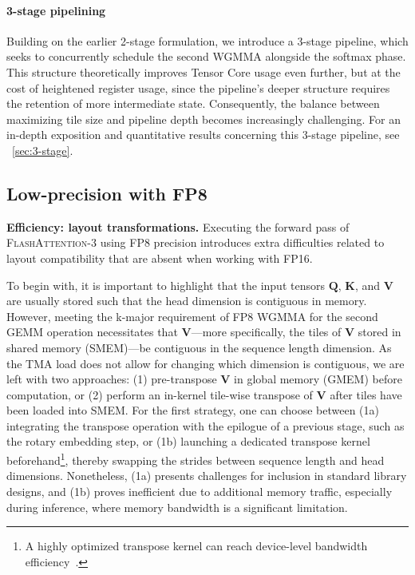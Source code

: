 \begin{enumerate}
\paragraph{3-stage pipelining} Building on the earlier 2-stage formulation, we introduce a 3-stage pipeline, which seeks to concurrently schedule the second WGMMA alongside the softmax phase. This structure theoretically improves Tensor Core usage even further, but at the cost of heightened register usage, since the pipeline's deeper structure requires the retention of more intermediate state. Consequently, the balance between maximizing tile size and pipeline depth becomes increasingly challenging. For an in-depth exposition and quantitative results concerning this 3-stage pipeline, see ~\cref{sec:3-stage}.

\subsection{Low-precision with FP8}
\label{sec:algofp8}

\textbf{Efficiency: layout transformations.} Executing the forward pass of \textsc{FlashAttention-3} using FP8 precision introduces extra difficulties related to layout compatibility that are absent when working with FP16.

To begin with, it is important to highlight that the input tensors $\mathbf{Q}$, $\mathbf{K}$, and $\mathbf{V}$ are usually stored such that the head dimension is contiguous in memory. However, meeting the k-major requirement of FP8 WGMMA for the second GEMM operation necessitates that $\mathbf{V}$—more specifically, the tiles of $\mathbf{V}$ stored in shared memory (SMEM)—be contiguous in the sequence length dimension. As the TMA load does not allow for changing which dimension is contiguous, we are left with two approaches: (1) pre-transpose $\mathbf{V}$ in global memory (GMEM) before computation, or (2) perform an in-kernel tile-wise transpose of $\mathbf{V}$ after tiles have been loaded into SMEM. For the first strategy, one can choose between (1a) integrating the transpose operation with the epilogue of a previous stage, such as the rotary embedding step, or (1b) launching a dedicated transpose kernel beforehand\footnote{A highly optimized transpose kernel can reach device-level bandwidth efficiency~\citep{colfax_cutlass_transpose_2024}.}, thereby swapping the strides between sequence length and head dimensions. Nonetheless, (1a) presents challenges for inclusion in standard library designs, and (1b) proves inefficient due to additional memory traffic, especially during inference, where memory bandwidth is a significant limitation.


\end{enumerate}
